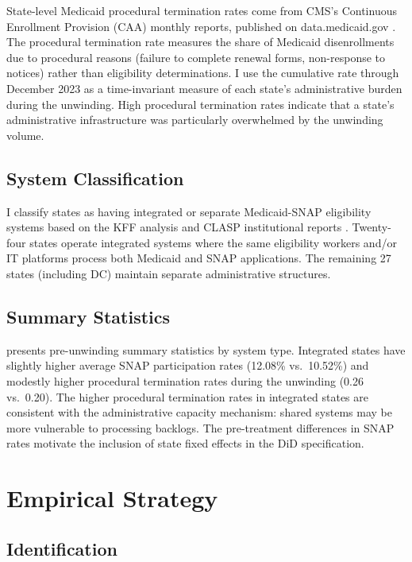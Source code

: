 \documentclass[12pt]{article}
\begin{document}
State-level Medicaid procedural termination rates come from CMS's Continuous Enrollment Provision (CAA) monthly reports, published on data.medicaid.gov \citep{cms2023}. The procedural termination rate measures the share of Medicaid disenrollments due to procedural reasons (failure to complete renewal forms, non-response to notices) rather than eligibility determinations. I use the cumulative rate through December 2023 as a time-invariant measure of each state's administrative burden during the unwinding. High procedural termination rates indicate that a state's administrative infrastructure was particularly overwhelmed by the unwinding volume.

\subsection{System Classification}

I classify states as having integrated or separate Medicaid-SNAP eligibility systems based on the KFF analysis \citep{kff2023unwinding} and CLASP institutional reports \citep{clasp2023}. Twenty-four states operate integrated systems where the same eligibility workers and/or IT platforms process both Medicaid and SNAP applications. The remaining 27 states (including DC) maintain separate administrative structures.

\subsection{Summary Statistics}



 presents pre-unwinding summary statistics by system type. Integrated states have slightly higher average SNAP participation rates (12.08\% vs.\ 10.52\%) and modestly higher procedural termination rates during the unwinding (0.26 vs.\ 0.20). The higher procedural termination rates in integrated states are consistent with the administrative capacity mechanism: shared systems may be more vulnerable to processing backlogs. The pre-treatment differences in SNAP rates motivate the inclusion of state fixed effects in the DiD specification.


\section{Empirical Strategy}
\label{sec:strategy}

\subsection{Identification}
\end{document}
